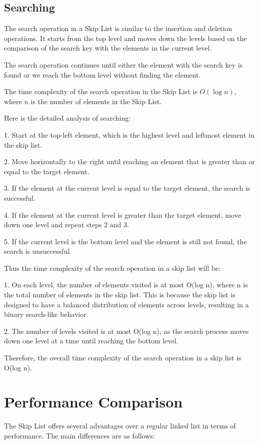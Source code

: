 \documentclass[12pt]{article}
\begin{document}
\subsection{Searching}
The search operation in a Skip List is similar to the insertion and deletion operations. It starts from the top level and moves down the levels based on the comparison of the search key with the elements in the current level.

The search operation continues until either the element with the search key is found or we reach the bottom level without finding the element.

The time complexity of the search operation in the Skip List is $O(\log n)$, where $n$ is the number of elements in the Skip List.

Here is the detailed analysis of searching:

1. Start at the top-left element, which is the highest level and leftmost element in the skip list.

2. Move horizontally to the right until reaching an element that is greater than or equal to the target element.

3. If the element at the current level is equal to the target element, the search is successful.

4. If the element at the current level is greater than the target element, move down one level and repeat steps 2 and 3.

5. If the current level is the bottom level and the element is still not found, the search is unsuccessful.

Thus the time complexity of the search operation in a skip list will be:

1. On each level, the number of elements visited is at most O(log n), where n is the total number of elements in the skip list. This is because the skip list is designed to have a balanced distribution of elements across levels, resulting in a binary search-like behavior.

2. The number of levels visited is at most O(log n), as the search process moves down one level at a time until reaching the bottom level.

Therefore, the overall time complexity of the search operation in a skip list is O(log n).

\section{Performance Comparison}
The Skip List offers several advantages over a regular linked list in terms of performance. The main differences are as follows:
\end{document}
